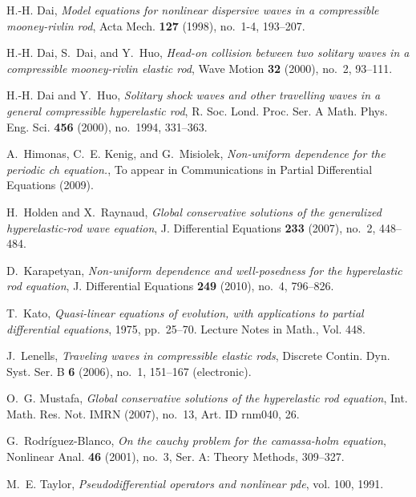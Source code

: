 \documentclass[12pt,reqno]{amsart}
\numberwithin{equation}{section}  %
\numberwithin{figure}{section}
\begin{document}
\begin{thebibliography}{HKM09}
H.-H. Dai, \emph{Model equations for nonlinear dispersive waves in a
  compressible mooney-rivlin rod}, Acta Mech. \textbf{127} (1998), no.~1-4,
  193--207.

H.-H. Dai, S.~Dai, and Y.~Huo, \emph{Head-on collision between two solitary
  waves in a compressible mooney-rivlin elastic rod}, Wave Motion \textbf{32}
  (2000), no.~2, 93--111.

H.-H. Dai and Y.~Huo, \emph{Solitary shock waves and other travelling waves in
  a general compressible hyperelastic rod}, R. Soc. Lond. Proc. Ser. A Math.
  Phys. Eng. Sci. \textbf{456} (2000), no.~1994, 331--363.

A.~Himonas, C.~E. Kenig, and G.~Misiolek, \emph{Non-uniform dependence for the
  periodic ch equation.}, To appear in Communications in Partial Differential
  Equations (2009).

H.~Holden and X.~Raynaud, \emph{Global conservative solutions of the
  generalized hyperelastic-rod wave equation}, J. Differential Equations
  \textbf{233} (2007), no.~2, 448--484.

D.~Karapetyan, \emph{Non-uniform dependence and well-posedness for the
  hyperelastic rod equation}, J. Differential Equations \textbf{249} (2010),
  no.~4, 796--826. 

T.~Kato, \emph{Quasi-linear equations of evolution, with applications to
  partial differential equations}, 1975, pp.~25--70. Lecture Notes in Math.,
  Vol. 448.

J.~Lenells, \emph{Traveling waves in compressible elastic rods}, Discrete
  Contin. Dyn. Syst. Ser. B \textbf{6} (2006), no.~1, 151--167 (electronic).

O.~G. Mustafa, \emph{Global conservative solutions of the hyperelastic rod
  equation}, Int. Math. Res. Not. IMRN (2007), no.~13, Art. ID rnm040, 26.

G.~Rodr\'iguez-Blanco, \emph{On the cauchy problem for the camassa-holm
  equation}, Nonlinear Anal. \textbf{46} (2001), no.~3, Ser. A: Theory Methods,
  309--327.

M.~E. Taylor, \emph{Pseudodifferential operators and nonlinear pde}, vol. 100,
  1991.


\end{thebibliography}
\end{document}
